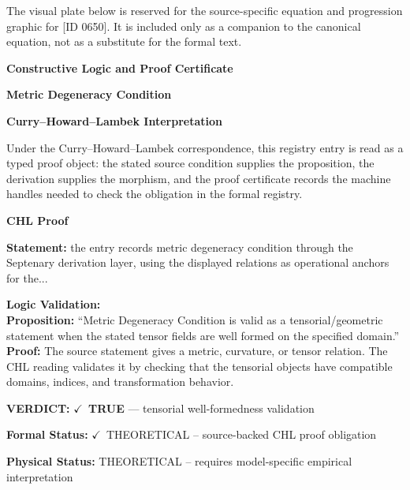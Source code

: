 \begingroup\footnotesize\sloppy
The visual plate below is reserved for the source-specific equation and progression graphic for [ID 0650]. It is included only as a companion to the canonical equation, not as a substitute for the formal text.
\par\endgroup
\ifTZPDarkEdition
{}
\fi

\clearpage
\begingroup\tzpsupportsetup
\noindent\textbf{\fontsize{10.8pt}{12.8pt}\selectfont [ID 0650] Constructive Logic and Proof Certificate}\par
\noindent\textbf{\fontsize{10pt}{12pt}\selectfont Metric Degeneracy Condition}\par
\vspace{0.45em}
\begingroup
\footnotesize
\setlength{\parskip}{0.22em}
\setlength{\parindent}{0pt}
\noindent\textbf{Curry--Howard--Lambek Interpretation}\par
Under the Curry--Howard--Lambek correspondence, this registry entry is read as a typed proof
object: the stated source condition supplies the proposition, the derivation supplies the
morphism, and the proof certificate records the machine handles needed to check the obligation
in the formal registry.

\vspace{0.45em}
\noindent\textbf{CHL Proof}\par
\textbf{Statement:} the entry records metric degeneracy condition through the Septenary derivation layer,
using the displayed relations as operational anchors for the...

\textbf{Logic Validation:}\\
\textbf{Proposition:} ``Metric Degeneracy Condition is valid as a tensorial/geometric statement when the stated
tensor fields are well formed on the specified domain.''\\
\textbf{Proof:} The source statement gives a metric, curvature, or tensor relation. The CHL reading
validates it by checking that the tensorial objects have compatible domains, indices,
and transformation behavior.

\textbf{VERDICT:} \ensuremath{\checkmark}\ \textbf{TRUE} --- tensorial well-formedness validation

\textbf{Formal Status:} \ensuremath{\checkmark}\ THEORETICAL -- source-backed CHL proof obligation

\textbf{Physical Status:} THEORETICAL -- requires model-specific empirical interpretation
\par\vspace{0.45em}
\par
\ifTZPDarkEdition
{}
\fi
\endgroup
\endgroup
